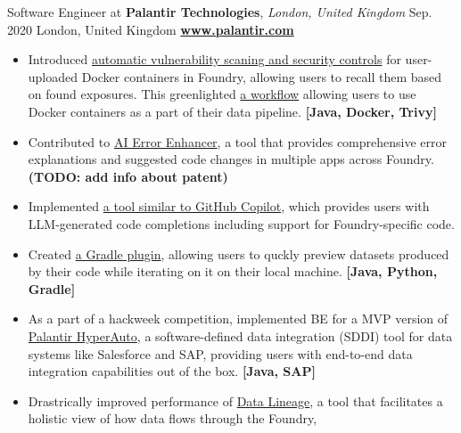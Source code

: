 \cveventflat
{Software Engineer at }
{\textbf{Palantir Technologies}, \textit{London, United Kingdom}}
{Sep. 2020}
{London, United Kingdom}
\newline
\href{https://www.palantir.com/}{\textbf{www.palantir.com}}
\begin{itemize}
    \item {
        Introduced
        \href{https://www.palantir.com/docs/foundry/administration/container-governance/}{automatic vulnerability scaning and security controls}
        for user-uploaded Docker containers in Foundry, allowing users to recall them based on found exposures.
        This greenlighted
        \href{https://www.palantir.com/docs/foundry/transforms-python/container-overview/}{a workflow}
        allowing users to use Docker containers as a part of their data pipeline.
    }
    \textbf{[Java, Docker, Trivy]}
    \item {
        Contributed to
        \href{https://www.palantir.com/docs/foundry/code-repositories/aip-features/#ai-error-enhancer}{AI Error Enhancer},
        a tool that provides comprehensive error explanations and suggested code changes in multiple apps across Foundry.
    }
    \textbf{(TODO: add info about patent)}
    \item {
        Implemented
        \href{https://www.palantir.com/docs/foundry/code-repositories/aip-features/#code-autocomplete}{a tool similar to GitHub Copilot},
        which provides users with LLM-generated code completions including support for Foundry-specific code.
    }
    \item {
        Created
        \href{https://www.palantir.com/docs/foundry/transforms-common/local-preview/}{a Gradle plugin},
        allowing users to quckly preview datasets produced by their code while iterating on it on their local machine.
    }
    \textbf{[Java, Python, Gradle]}
    \item {
        As a part of a hackweek competition, implemented BE for a MVP version of
        \href{https://www.palantir.com/docs/foundry/hyperauto/overview/}{Palantir HyperAuto},
        a software-defined data integration (SDDI) tool for data systems like Salesforce and SAP,
        providing users with end-to-end data integration capabilities out of the box.
    }
    \textbf{[Java, SAP]}
    \item {
        Drastrically improved performance of
        \href{https://www.palantir.com/docs/foundry/data-lineage/overview/}{Data Lineage},
        a tool that facilitates a holistic view of how data flows through the Foundry,
}
\end{itemize}
